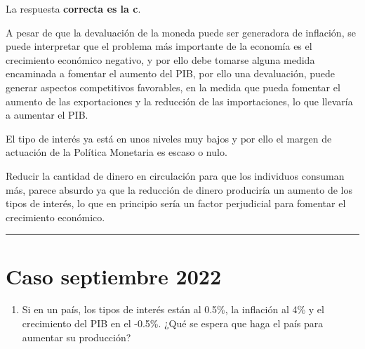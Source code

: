 \documentclass[
  letterpaper,
  DIV=11,
  numbers=noendperiod]{scrreprt}
\providecommand{\tightlist}{%
  \setlength{\itemsep}{0pt}\setlength{\parskip}{0pt}}\usepackage{longtable,booktabs,array}
\begin{document}
\begin{tcolorbox}[enhanced jigsaw, opacityback=0, bottomrule=.15mm, colframe=quarto-callout-tip-color-frame, arc=.35mm, leftrule=.75mm, breakable, colback=white, rightrule=.15mm, toprule=.15mm, left=2mm]
\begin{minipage}[t]{5.5mm}
\textcolor{quarto-callout-tip-color}{\faLightbulb}
\end{minipage}%
\begin{minipage}[t]{\textwidth - 5.5mm}

La respuesta \textbf{correcta es la c}.

A pesar de que la devaluación de la moneda puede ser generadora de
inflación, se puede interpretar que el problema más importante de la
economía es el crecimiento económico negativo, y por ello debe tomarse
alguna medida encaminada a fomentar el aumento del PIB, por ello una
devaluación, puede generar aspectos competitivos favorables, en la
medida que pueda fomentar el aumento de las exportaciones y la reducción
de las importaciones, lo que llevaría a aumentar el PIB.

El tipo de interés ya está en unos niveles muy bajos y por ello el
margen de actuación de la Política Monetaria es escaso o nulo.

Reducir la cantidad de dinero en circulación para que los individuos
consuman más, parece absurdo ya que la reducción de dinero produciría un
aumento de los tipos de interés, lo que en principio sería un factor
perjudicial para fomentar el crecimiento económico.

\end{minipage}%
\end{tcolorbox}

\begin{center}\rule{0.5\linewidth}{0.5pt}\end{center}

\hypertarget{caso-septiembre-2022}{%
\chapter*{Caso septiembre 2022}\label{caso-septiembre-2022}}


\begin{enumerate}
\def\labelenumi{\arabic{enumi}.}
\tightlist
\item
  Si en un país, los tipos de interés están al 0.5\%, la inflación al
  4\% y el crecimiento del PIB en el -0.5\%. ¿Qué se espera que haga el
  país para aumentar su producción?
\end{enumerate}
\end{document}
